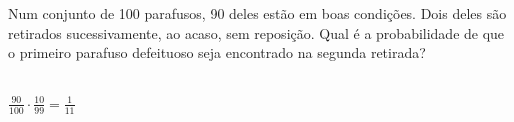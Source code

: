 \begin{ex}
Num conjunto de 100 parafusos, 90 deles estão em boas condições. Dois deles são retirados sucessivamente, ao acaso, sem reposição. Qual é a probabilidade de que o primeiro parafuso defeituoso seja encontrado na segunda retirada?
 \begin{sol}
   \phantom{A} \\
   $\frac{90}{100}\cdot\frac{10}{99}=\frac{1}{11}$
 \end{sol}
\end{ex}
